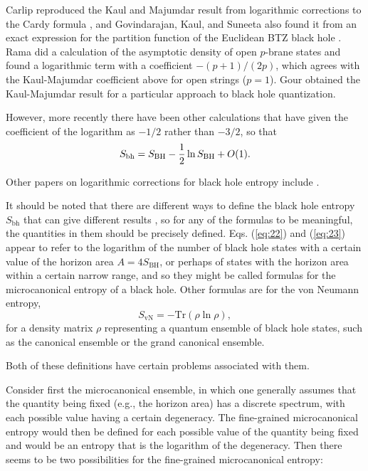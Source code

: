 \documentclass[12pt]{article} \usepackage{latexsym} \textwidth 15cm
\begin{document}
Carlip \cite{Carlip} reproduced the Kaul and Majumdar result from
logarithmic corrections to the Cardy formula \cite{Cardy,BCN}, and
Govindarajan, Kaul, and Suneeta \cite{GKS2} also found it from an exact
expression for the partition function of the Euclidean BTZ black hole
\cite{BTZ,BHTZ}.  Rama \cite{Rama} did a calculation of the asymptotic
density of open $p$-brane states and found a logarithmic term with a
coefficient $-(p+1)/(2p)$, which agrees with the Kaul-Majumdar
coefficient above for open strings ($p=1$).  Gour \cite{Gour} obtained
the Kaul-Majumdar result for a particular approach to black hole
quantization.

However, more recently there have been other calculations
\cite{DL,Meiss,GM1,GM2} that have given the coefficient of the
logarithm as $-1/2$ rather than $-3/2$, so that
 \begin{equation}
 S_{\mathrm{bh}} = S_{\mathrm{BH}} - {1\over 2} \ln{S_{\mathrm{BH}}} +
 O(1).
 \label{eq:23}
 \end{equation}
 
Other papers on logarithmic corrections for black hole entropy include
\cite{GM94,DKM,DMB,MP,NOO,CG,CM2,Set1,Set2,
ACAP,Hod,Myung,Park2,AL,Med1,CM3,More,Med2,Khrip}.

It should be noted that there are different ways to define the black
hole entropy $S_{\mathrm{bh}}$ that can give different results
\cite{DMB,CM2}, so for any of the formulas to be meaningful, the
quantities in them should be precisely defined.  Eqs. (\ref{eq:22}) and
(\ref{eq:23}) appear to refer to the logarithm of the number of black
hole states with a certain value of the horizon area $A =
4S_{\mathrm{BH}}$, or perhaps of states with the horizon area within a
certain narrow range, and so they might be called formulas for the
microcanonical entropy of a black hole.  Other formulas are for the von
Neumann entropy,
 \begin{equation}
 S_{\mathrm{vN}} = - \mathrm{Tr}(\rho \ln{\rho}),
 \label{eq:24}
 \end{equation}
for a density matrix $\rho$ representing a quantum ensemble of black
hole states, such as the canonical ensemble or the grand canonical
ensemble.

Both of these definitions have certain problems associated with them. 

Consider first the microcanonical ensemble, in which one generally
assumes that the quantity being fixed (e.g., the horizon area) has a
discrete spectrum, with each possible value having a certain
degeneracy.  The fine-grained microcanonical entropy would then be
defined for each possible value of the quantity being fixed and would
be an entropy that is the logarithm of the degeneracy.  Then there
seems to be two possibilities for the fine-grained microcanonical
entropy:
\end{document}
